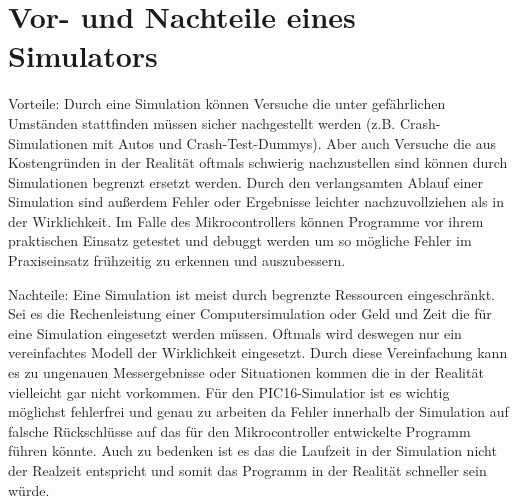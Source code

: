 \section{Vor- und Nachteile eines Simulators}

Vorteile:
Durch eine Simulation können Versuche die unter gefährlichen Umständen stattfinden müssen sicher nachgestellt werden (z.B. Crash-Simulationen mit Autos und Crash-Test-Dummys).
Aber auch Versuche die aus Kostengründen in der Realität oftmals schwierig nachzustellen sind können durch Simulationen begrenzt ersetzt werden.
Durch den verlangsamten Ablauf einer Simulation sind außerdem Fehler oder Ergebnisse leichter nachzuvollziehen als in der Wirklichkeit.
Im Falle des Mikrocontrollers können Programme vor ihrem praktischen Einsatz getestet und debuggt werden um so mögliche Fehler im Praxiseinsatz frühzeitig zu erkennen und auszubessern.

Nachteile:
Eine Simulation ist meist durch begrenzte Ressourcen eingeschränkt. Sei es die Rechenleistung einer Computersimulation oder Geld und Zeit die für eine Simulation eingesetzt werden müssen. Oftmals wird deswegen nur ein vereinfachtes Modell der Wirklichkeit eingesetzt. Durch diese Vereinfachung kann es zu ungenauen Messergebnisse oder Situationen kommen die in der Realität vielleicht gar nicht vorkommen.
Für den PIC16-Simulatior ist es wichtig möglichst fehlerfrei und genau zu arbeiten da Fehler innerhalb der Simulation auf falsche Rückschlüsse auf das für den Mikrocontroller entwickelte Programm führen könnte. Auch zu bedenken ist es das die Laufzeit in der Simulation nicht der Realzeit entspricht und somit das Programm in der Realität schneller sein würde.
